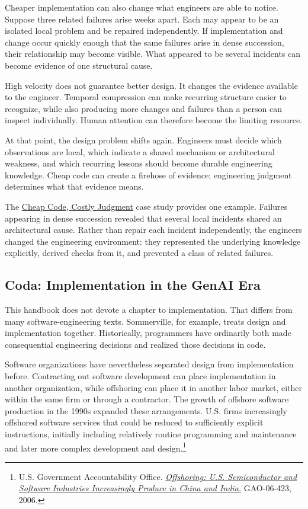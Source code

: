 Cheaper implementation can also change what engineers are able to notice.
Suppose three related failures arise weeks apart.
Each may appear to be an isolated local problem and be repaired independently.
If implementation and change occur quickly enough that the same failures arise in dense succession, their relationship may become visible.
What appeared to be several incidents can become evidence of one structural cause.

High velocity does not guarantee better design.
It changes the evidence available to the engineer.
Temporal compression can make recurring structure easier to recognize, while also producing more changes and failures than a person can inspect individually.
Human attention can therefore become the limiting resource.

At that point, the design problem shifts again.
Engineers must decide which observations are local, which indicate a shared mechanism or architectural weakness, and which recurring lessons should become durable engineering knowledge.
Cheap code can create a firehose of evidence; engineering judgment determines what that evidence means.

The \href{https://arxiv.org/abs/2607.01087}{Cheap Code, Costly Judgment} case study provides one example.
Failures appearing in dense succession revealed that several local incidents shared an architectural cause.
Rather than repair each incident independently, the engineers changed the engineering environment: they represented the underlying knowledge explicitly, derived checks from it, and prevented a class of related failures.

\subsection{Coda: Implementation in the GenAI Era}\label{coda-implementation-in-the-genai-era}

This handbook does not devote a chapter to implementation.
That differs from many software-engineering texts.
Sommerville, for example, treats design and implementation together.
Historically, programmers have ordinarily both made consequential engineering decisions and realized those decisions in code.

Software organizations have nevertheless separated design from implementation before.
Contracting out software development can place implementation in another organization, while offshoring can place it in another labor market, either within the same firm or through a contractor.
The growth of offshore software production in the 1990s expanded these arrangements.
U.S. firms increasingly offshored software services that could be reduced to sufficiently explicit instructions, initially including relatively routine programming and maintenance and later more complex development and design.\footnote{U.S. Government Accountability Office. \href{https://www.gao.gov/products/gao-06-423}{\emph{Offshoring: U.S. Semiconductor and Software Industries Increasingly Produce in China and India.}} GAO-06-423, 2006.}

